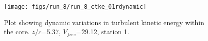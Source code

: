 \begin{figure}[H]
\centering
\texttt{[image: figs/run\_8/run\_8\_ctke\_01rdynamic]}
\caption{Plot showing dynamic variations in turbulent kinetic energy within the core. $z/c$=5.37, $V_{free}$=29.12, station 1.}
\label{fig:run_8_ctke_01rdynamic}
\end{figure}


